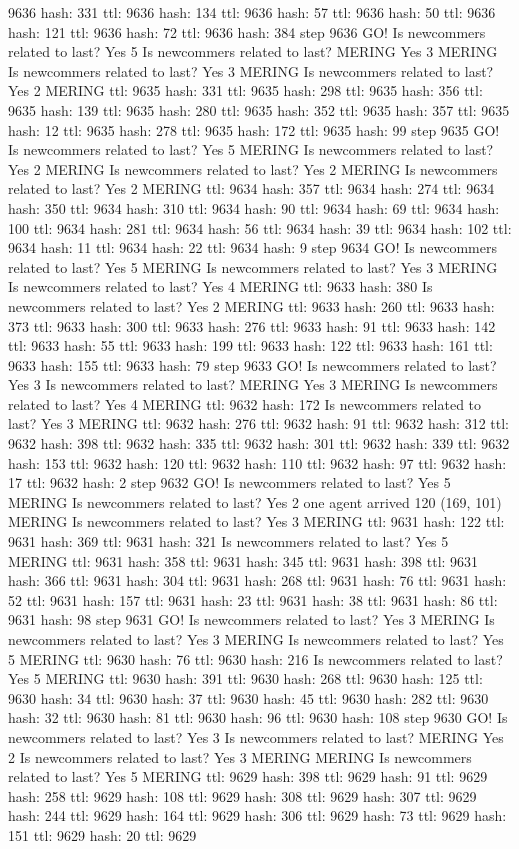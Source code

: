 9636 hash: 331 ttl: 9636 hash: 134 ttl: 9636 hash: 57 ttl: 9636 hash: 50 ttl: 9636 hash: 121 ttl: 9636 hash: 72 ttl: 9636 hash: 384 step 9636 GO! Is newcommers related to last? Yes 5 Is newcommers related to last? MERING Yes 3 MERING Is newcommers related to last? Yes 3 MERING Is newcommers related to last? Yes 2 MERING ttl: 9635 hash: 331 ttl: 9635 hash: 298 ttl: 9635 hash: 356 ttl: 9635 hash: 139 ttl: 9635 hash: 280 ttl: 9635 hash: 352 ttl: 9635 hash: 357 ttl: 9635 hash: 12 ttl: 9635 hash: 278 ttl: 9635 hash: 172 ttl: 9635 hash: 99 step 9635 GO! Is newcommers related to last? Yes 5 MERING Is newcommers related to last? Yes 2 MERING Is newcommers related to last? Yes 2 MERING Is newcommers related to last? Yes 2 MERING ttl: 9634 hash: 357 ttl: 9634 hash: 274 ttl: 9634 hash: 350 ttl: 9634 hash: 310 ttl: 9634 hash: 90 ttl: 9634 hash: 69 ttl: 9634 hash: 100 ttl: 9634 hash: 281 ttl: 9634 hash: 56 ttl: 9634 hash: 39 ttl: 9634 hash: 102 ttl: 9634 hash: 11 ttl: 9634 hash: 22 ttl: 9634 hash: 9 step 9634 GO! Is newcommers related to last? Yes 5 MERING Is newcommers related to last? Yes 3 MERING Is newcommers related to last? Yes 4 MERING ttl: 9633 hash: 380 Is newcommers related to last? Yes 2 MERING ttl: 9633 hash: 260 ttl: 9633 hash: 373 ttl: 9633 hash: 300 ttl: 9633 hash: 276 ttl: 9633 hash: 91 ttl: 9633 hash: 142 ttl: 9633 hash: 55 ttl: 9633 hash: 199 ttl: 9633 hash: 122 ttl: 9633 hash: 161 ttl: 9633 hash: 155 ttl: 9633 hash: 79 step 9633 GO! Is newcommers related to last? Yes 3 Is newcommers related to last? MERING Yes 3 MERING Is newcommers related to last? Yes 4 MERING ttl: 9632 hash: 172 Is newcommers related to last? Yes 3 MERING ttl: 9632 hash: 276 ttl: 9632 hash: 91 ttl: 9632 hash: 312 ttl: 9632 hash: 398 ttl: 9632 hash: 335 ttl: 9632 hash: 301 ttl: 9632 hash: 339 ttl: 9632 hash: 153 ttl: 9632 hash: 120 ttl: 9632 hash: 110 ttl: 9632 hash: 97 ttl: 9632 hash: 17 ttl: 9632 hash: 2 step 9632 GO! Is newcommers related to last? Yes 5 MERING Is newcommers related to last? Yes 2 one agent arrived 120 (169, 101) MERING Is newcommers related to last? Yes 3 MERING ttl: 9631 hash: 122 ttl: 9631 hash: 369 ttl: 9631 hash: 321 Is newcommers related to last? Yes 5 MERING ttl: 9631 hash: 358 ttl: 9631 hash: 345 ttl: 9631 hash: 398 ttl: 9631 hash: 366 ttl: 9631 hash: 304 ttl: 9631 hash: 268 ttl: 9631 hash: 76 ttl: 9631 hash: 52 ttl: 9631 hash: 157 ttl: 9631 hash: 23 ttl: 9631 hash: 38 ttl: 9631 hash: 86 ttl: 9631 hash: 98 step 9631 GO! Is newcommers related to last? Yes 3 MERING Is newcommers related to last? Yes 3 MERING Is newcommers related to last? Yes 5 MERING ttl: 9630 hash: 76 ttl: 9630 hash: 216 Is newcommers related to last? Yes 5 MERING ttl: 9630 hash: 391 ttl: 9630 hash: 268 ttl: 9630 hash: 125 ttl: 9630 hash: 34 ttl: 9630 hash: 37 ttl: 9630 hash: 45 ttl: 9630 hash: 282 ttl: 9630 hash: 32 ttl: 9630 hash: 81 ttl: 9630 hash: 96 ttl: 9630 hash: 108 step 9630 GO! Is newcommers related to last? Yes 3 Is newcommers related to last? MERING Yes 2 Is newcommers related to last? Yes 3 MERING MERING Is newcommers related to last? Yes 5 MERING ttl: 9629 hash: 398 ttl: 9629 hash: 91 ttl: 9629 hash: 258 ttl: 9629 hash: 108 ttl: 9629 hash: 308 ttl: 9629 hash: 307 ttl: 9629 hash: 244 ttl: 9629 hash: 164 ttl: 9629 hash: 306 ttl: 9629 hash: 73 ttl: 9629 hash: 151 ttl: 9629 hash: 20 ttl: 9629 